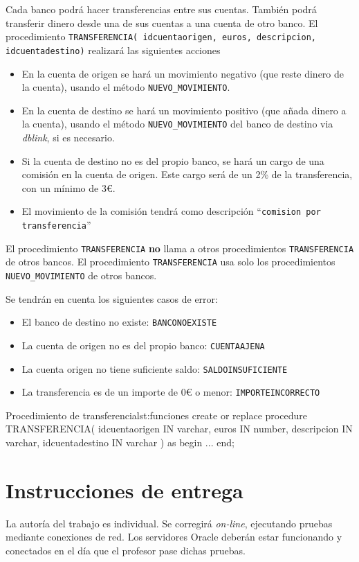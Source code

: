 \begin{homeworkProblem}
Cada banco podrá hacer transferencias entre sus cuentas. También podrá transferir dinero desde una de sus cuentas a una cuenta de otro banco. El procedimiento \texttt{TRANSFERENCIA( idcuentaorigen, euros, descripcion, idcuentadestino)} realizará las siguientes acciones
\begin{itemize}
\item En la cuenta de origen se hará un movimiento negativo (que reste dinero de la cuenta), usando el método \texttt{NUEVO\_MOVIMIENTO}.
\item En la cuenta de destino se hará un movimiento positivo (que añada dinero a la cuenta), usando el método \texttt{NUEVO\_MOVIMIENTO} del banco de destino via \textit{dblink}, si es necesario.
\item Si la cuenta de destino no es del propio banco, se hará un cargo de una comisión en la cuenta de origen. Este cargo será de un 2\% de la transferencia, con un mínimo de 3\euro.
\item El movimiento de la comisión tendrá como descripción ``\texttt{comision por transferencia}''  
\end{itemize}

\begin{Aviso}
  El procedimiento \texttt{TRANSFERENCIA} \textbf{no} llama a otros procedimientos \texttt{TRANSFERENCIA} de otros bancos.
  El procedimiento \texttt{TRANSFERENCIA} usa solo los procedimientos \texttt{NUEVO\_MOVIMIENTO} de otros bancos.
\end{Aviso}


Se tendrán en cuenta los siguientes casos de error:
\begin{itemize}
\item El banco de destino no existe: \texttt{BANCONOEXISTE}
\item La cuenta de origen no es del propio banco: \texttt{CUENTAAJENA}
\item La cuenta origen no tiene suficiente saldo: \texttt{SALDOINSUFICIENTE}
\item La transferencia es de un importe de 0{\euro} o menor: \texttt{IMPORTEINCORRECTO}
\end{itemize}

  \begin{listadosql}{Procedimiento de transferencia}{lst:funciones}
create or replace procedure TRANSFERENCIA(
  idcuentaorigen IN varchar, 
  euros IN number,
  descripcion IN varchar,
  idcuentadestino IN varchar )
as begin
  ...
end; 

\end{listadosql}


\end{homeworkProblem}


\section{Instrucciones de entrega}
La autoría del trabajo es individual. Se corregirá \textit{on-line}, ejecutando pruebas mediante conexiones de red. Los servidores Oracle deberán estar funcionando y conectados en el día que el profesor pase dichas pruebas.








